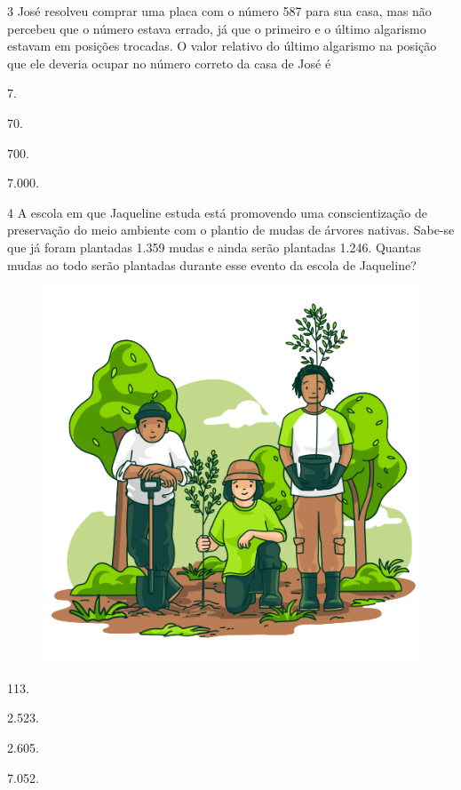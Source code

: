 \pagebreak
\num{3} José resolveu comprar uma placa com o número 587 para sua casa, mas
não percebeu que o número estava
errado, já que o primeiro e o último algarismo estavam em posições
trocadas. O valor relativo do último algarismo na posição que ele 
deveria ocupar no número correto da casa de José é

\begin{escolha}
\item
  7.
\item
  70.
\item
  700.
\item
  7.000.
\end{escolha}


\num{4} A escola em que Jaqueline estuda está promovendo uma conscientização de
preservação do meio ambiente com o plantio de mudas de árvores
nativas. Sabe-se que já foram plantadas 1.359 mudas e ainda serão
plantadas 1.246. Quantas mudas ao todo serão plantadas durante esse
evento da escola de Jaqueline?

\begin{figure}[htpb!]
\centering
\includegraphics[width=.6\textwidth]{media/image76a.png}
\end{figure}

\begin{multicols}{2}
\begin{escolha}
\item
  113.
\item
  2.523.
\item
  2.605.
\item
  7.052.
\end{escolha}
\end{multicols}

